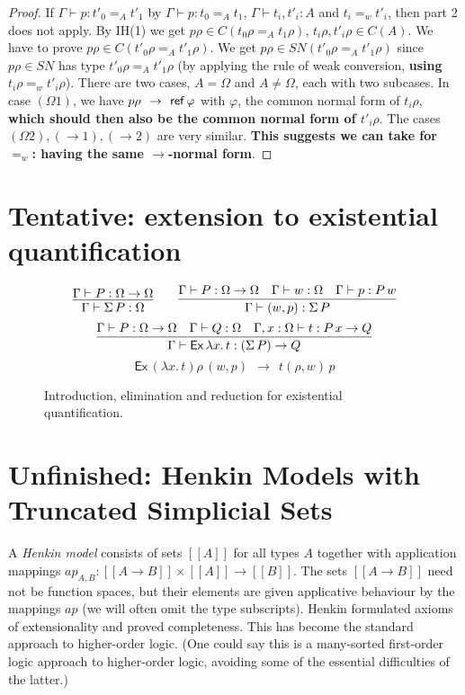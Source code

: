 \documentclass[10pt,a4paper]{article}
\newcommand{\lam}[2]{\lambda{#1.\,#2}}
\newcommand{\sbr}[1]{[\![#1]\!]}
\newcommand{\red}{~~{\to}~~}
\newcommand{\SN}{\mathit{SN}}
\newcommand{\Ex}{\mathsf{Ex}}
\newcommand{\Ref}{{\sf ref}}
\begin{document}
\begin{proof}
If $\Gamma\vdash p: t'_0 =_A t'_1$ by $\Gamma\vdash p: t_0 =_A t_1$, 
$\Gamma\vdash t_i,t'_i:A$ and $t_i =_{w} t'_i$,
then part 2 does not apply. By IH(1) we get $p\rho \in C(t_0\rho =_A t_1\rho)$, 
$t_i\rho,t'_i\rho\in C(A)$. We have to prove $p\rho \in C(t'_0\rho =_A t'_1\rho)$.
We get $p\rho \in SN(t'_0\rho =_A t'_1\rho)$ since $p\rho\in\SN$ has type
$t'_0\rho =_A t'_1\rho$ (by applying the rule of weak conversion, 
{\bf using $t_i\rho =_{w} t'_i\rho$}).
There are two cases, $A=\Omega$ and $A\not=\Omega$, each with two subcases.
In case $(\Omega1)$, we have $p\rho \red \Ref\,\varphi$ with $\varphi$,
the common normal form of $t_i\rho$, {\bf which should then also be the common
normal form of $t'_i\rho$}. The cases $(\Omega2),({\to}1),({\to}2)$ are very similar.
{\bf This suggests we can take for $=_w$: having the same ${\to}$-normal form}.
\end{proof}

\section{Tentative: extension to existential quantification}\label{sec:exists}

\begin{figure}[h]
\[
\infer{\Gamma\vdash \Sigma\,P : \Omega}{\Gamma\vdash P:\Omega\to\Omega}
\quad\quad
\infer{\Gamma\vdash (w,p):\Sigma\,P}{\Gamma\vdash P:\Omega\to\Omega\quad
\Gamma\vdash w:\Omega\quad\Gamma\vdash p : P\,w}
\]
\[
\infer{\Gamma\vdash \Ex\,\lam{x}{t}:(\Sigma\,P)\to Q}{\Gamma\vdash P:\Omega\to\Omega\quad
\Gamma\vdash Q:\Omega\quad\Gamma,x:\Omega \vdash t : P\,x \to Q}
\]
\[
\Ex\,(\lam{x}{t})\rho\,(w,p) \red t(\rho,w)\,p
\]

\caption{Introduction, elimination and reduction for existential quantification.
\label{exists_rules}}
\end{figure}

\section{Unfinished: Henkin Models with Truncated Simplicial Sets}\label{Henkin_tss}
A \emph{Henkin model} \cite{Henkin} consists of sets $\sbr{A}$
for all types $A$ together with application mappings 
$ap_{A,B}:\sbr{A\to B}\times\sbr{A}\to\sbr{B}$.
The sets $\sbr{A\to B}$ need not be function spaces, but their elements
are given applicative behaviour by the mappings $ap$ (we will often omit the
type subscripts). Henkin formulated axioms of extensionality and proved
completeness. This has become the standard approach to higher-order logic.
(One could say this is a many-sorted first-order logic approach to
higher-order logic, avoiding some of the essential difficulties of the
latter.)
\end{document}

